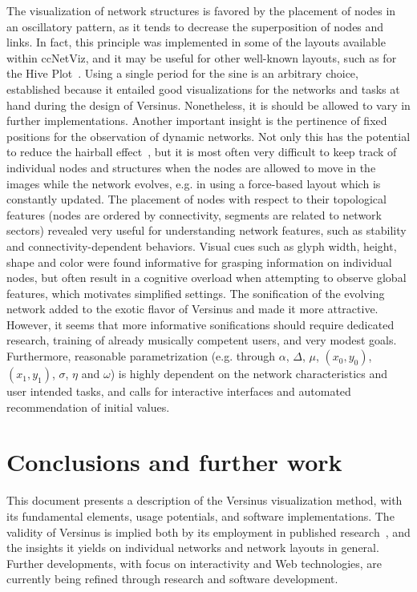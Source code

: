 \documentclass[runningheads]{llncs}
\begin{document}
The visualization of network structures is favored by the placement of nodes in an oscillatory pattern, as it tends to decrease the superposition of nodes and links. In fact, this principle was implemented in some of the layouts available within ccNetViz, and it may be useful for other well-known layouts, such as for the Hive Plot~\cite{hive}.
Using a single period for the sine is an arbitrary choice, established because it entailed good visualizations for the networks and tasks at hand during the design of Versinus. Nonetheless, it is should be allowed to vary in further implementations.
Another important insight is the pertinence of fixed positions for the observation of dynamic networks.
Not only this has the potential to reduce the hairball effect~\cite{hairball},
but it is most often very difficult to keep track of individual nodes and structures when the nodes are allowed to move in the images while the network evolves, e.g. in using a force-based layout which is constantly updated.
The placement of nodes with respect to their topological features (nodes are ordered by connectivity,
segments are related to network sectors) revealed very useful for understanding network features,
such as stability and connectivity-dependent behaviors.
Visual cues such as glyph width, height, shape and color were found informative for grasping information on individual nodes,
but often result in a cognitive overload when attempting to observe global features,
which motivates simplified settings.
The sonification of the evolving network added to the exotic flavor of Versinus and made it more attractive.
However, it seems that more informative sonifications should require dedicated research,
training of already musically competent users, and very modest goals. 
Furthermore, reasonable parametrization (e.g. through $\alpha$, $\Delta$, $\mu$, $(x_0, y_0)$, $(x_1, y_1)$, $\sigma$, $\eta$ and $\omega$) is highly dependent on the network characteristics and user intended tasks, and calls for interactive interfaces and automated recommendation of initial values.

\section{Conclusions and further work}\label{sec:con}
This document presents a description of the Versinus visualization method, with its fundamental elements, usage potentials, and software implementations.
The validity of Versinus is implied both by its employment in published research~\cite{stab,thesis}, and the insights it yields on individual networks and network
layouts in general.
Further developments,
with focus on interactivity and Web technologies,
are currently being refined
through research and software development.
\end{document}
